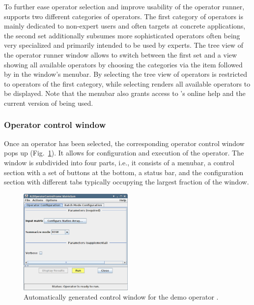 To further ease operator selection and improve usability of the operator runner,
\alida supports two different categories of operators. The first category of operators is mainly
dedicated to non-expert users and often targets at concrete applications, the
second set additionally subsumes more sophisticated operators often being very
specialized and primarily intended to be used by experts. The tree view of the operator runner
window allows to switch between the first set and a view showing all available operators by
choosing the categories via the item  followed by  in
the window's menubar. By selecting  the tree view of operators is restricted to
operators of the first category, while selecting  renders all available operators to be
displayed. Note that the menubar also grants access to \alida's online help and the current version
of \alida being used.

\subsubsection{Operator control window} 
\label{subsubsec:controlWin}
Once an operator has been selected, the corresponding operator control window
pops up (Fig.~\ref{fig:OpControlFrame}).
It allows for configuration and execution of the operator. The window is
subdivided into four parts, i.e., it consists of a menubar, a control
section with a set of buttons at the bottom, a status bar, and the configuration
section with different tabs typically occupying the largest fraction of the
window. 
\begin{figure}[t]
\begin{center}
\includegraphics[width=0.5\textwidth]{../images/screenShotOpControlFrame.png}
\caption{\label{fig:OpControlFrame}Automatically generated control window for
the \alida demo operator .}
\end{center}
\end{figure}

